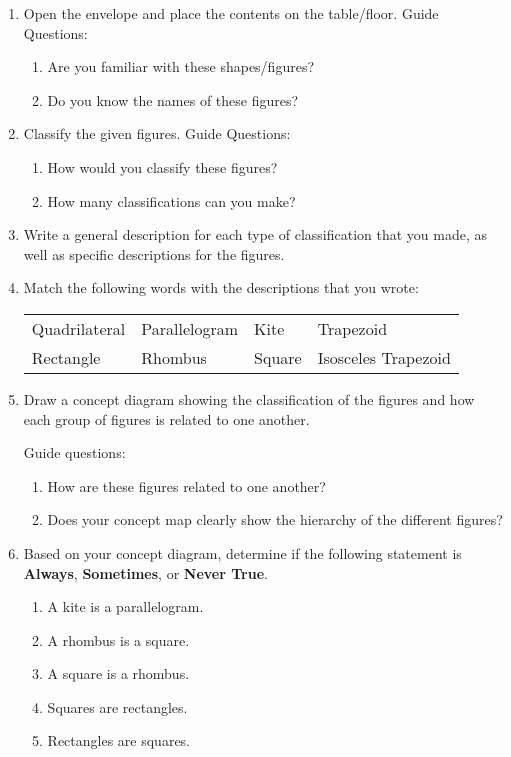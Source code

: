 \begin{enumerate}
\item Open the envelope and place the contents on the table/floor.
Guide Questions:
	\begin{enumerate}
	\item Are you familiar with these shapes/figures?
	\item Do you know the names of these figures?
	\end{enumerate}
\item Classify the given figures. Guide Questions:
	\begin{enumerate}
	\item How would you classify these figures?
	\item How many classifications can you make?
	\end{enumerate}
\item Write a general description for each type of classification that you made, as well as
specific descriptions for the figures.
\item Match the following words with the descriptions that you wrote:

\begin{tabular}{llll}
Quadrilateral & Parallelogram & Kite & Trapezoid\\
Rectangle & Rhombus & Square & Isosceles Trapezoid\\
\end{tabular}
\item Draw a concept diagram showing the classification of the figures and how each group of
figures is related to one another.

Guide questions:
\begin{enumerate}
\item How are these figures related to one another?
\item Does your concept map clearly show the hierarchy of the different figures?
\end{enumerate}
\item Based on your concept diagram, determine if the following statement is \textbf{Always},
\textbf{Sometimes}, or \textbf{Never True}.
\begin{enumerate}
\item A kite is a parallelogram.
\item A rhombus is a square.
\item A square is a rhombus.
\item Squares are rectangles.
\item Rectangles are squares.
\end{enumerate}
\end{enumerate}
